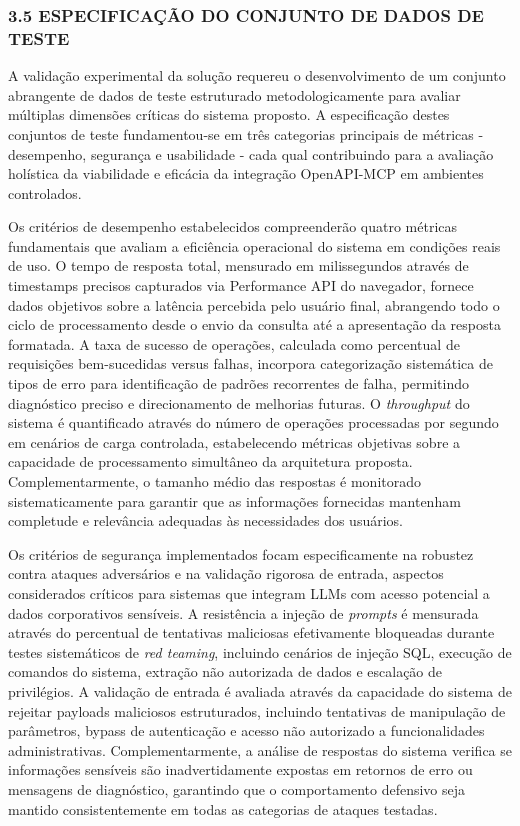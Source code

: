 \documentclass[
]{article}
\begin{document}
\subsubsection{3.5 ESPECIFICAÇÃO DO CONJUNTO DE DADOS DE
TESTE}\label{especificauxe7uxe3o-do-conjunto-de-dados-de-teste}

A validação experimental da solução requereu o desenvolvimento de um
conjunto abrangente de dados de teste estruturado metodologicamente para
avaliar múltiplas dimensões críticas do sistema proposto. A
especificação destes conjuntos de teste fundamentou-se em três
categorias principais de métricas - desempenho, segurança e usabilidade
- cada qual contribuindo para a avaliação holística da viabilidade e
eficácia da integração OpenAPI-MCP em ambientes controlados.

Os critérios de desempenho estabelecidos compreenderão quatro métricas
fundamentais que avaliam a eficiência operacional do sistema em
condições reais de uso. O tempo de resposta total, mensurado em
milissegundos através de timestamps precisos capturados via Performance
API do navegador, fornece dados objetivos sobre a latência percebida
pelo usuário final, abrangendo todo o ciclo de processamento desde o
envio da consulta até a apresentação da resposta formatada. A taxa de
sucesso de operações, calculada como percentual de requisições
bem-sucedidas versus falhas, incorpora categorização sistemática de
tipos de erro para identificação de padrões recorrentes de falha,
permitindo diagnóstico preciso e direcionamento de melhorias futuras. O
\emph{throughput} do sistema é quantificado através do número de
operações processadas por segundo em cenários de carga controlada,
estabelecendo métricas objetivas sobre a capacidade de processamento
simultâneo da arquitetura proposta. Complementarmente, o tamanho médio
das respostas é monitorado sistematicamente para garantir que as
informações fornecidas mantenham completude e relevância adequadas às
necessidades dos usuários.

Os critérios de segurança implementados focam especificamente na
robustez contra ataques adversários e na validação rigorosa de entrada,
aspectos considerados críticos para sistemas que integram LLMs com
acesso potencial a dados corporativos sensíveis. A resistência a injeção
de \emph{prompts} é mensurada através do percentual de tentativas
maliciosas efetivamente bloqueadas durante testes sistemáticos de
\emph{red teaming}, incluindo cenários de injeção SQL, execução de
comandos do sistema, extração não autorizada de dados e escalação de
privilégios. A validação de entrada é avaliada através da capacidade do
sistema de rejeitar payloads maliciosos estruturados, incluindo
tentativas de manipulação de parâmetros, bypass de autenticação e acesso
não autorizado a funcionalidades administrativas. Complementarmente, a
análise de respostas do sistema verifica se informações sensíveis são
inadvertidamente expostas em retornos de erro ou mensagens de
diagnóstico, garantindo que o comportamento defensivo seja mantido
consistentemente em todas as categorias de ataques testadas.
\end{document}
